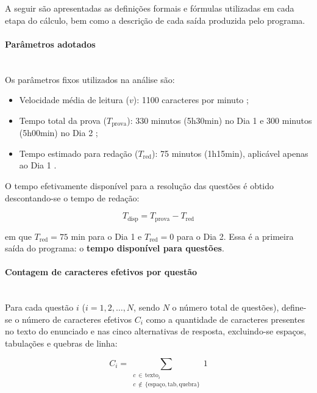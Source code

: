 \documentclass[a4paper,10pt, twocolumn]{article}
\begin{document}
A seguir são apresentadas as definições formais e fórmulas utilizadas em cada etapa do cálculo, bem como a descrição de cada saída produzida pelo programa.

\paragraph{Parâmetros adotados}
\mbox{}\\

Os parâmetros fixos utilizados na análise são:

\begin{itemize}
    \item Velocidade média de leitura ($v$): 1100 caracteres por minuto \cite{Messias2008};
    \item Tempo total da prova ($T_{\text{prova}}$): 330 minutos (5h30min) no Dia 1 e 300 minutos (5h00min) no Dia 2 \cite{inep_enem_servico};
    \item Tempo estimado para redação ($T_{\text{red}}$): 75 minutos (1h15min), aplicável apenas ao Dia 1 \cite{brasil_escola_redacao_enem}.
\end{itemize}

O tempo efetivamente disponível para a resolução das questões é obtido descontando-se o tempo de redação:

\begin{equation}
T_{\text{disp}} = T_{\text{prova}} - T_{\text{red}}
\label{eq:tempo_disponivel}
\end{equation}

em que $T_{\text{red}} = 75$ min para o Dia 1 e $T_{\text{red}} = 0$ para o Dia 2. Essa é a primeira saída do programa: o \textbf{tempo disponível para questões}.

\paragraph{Contagem de caracteres efetivos por questão}
\mbox{}\\

Para cada questão $i$ ($i = 1, 2, \ldots, N$, sendo $N$ o número total de questões), define-se o número de caracteres efetivos $C_i$ como a quantidade de caracteres presentes no texto do enunciado e nas cinco alternativas de resposta, excluindo-se espaços, tabulações e quebras de linha:

\begin{equation}
C_i = \sum_{\substack{c \,\in\, \text{texto}_i \\ c \,\notin\, \{\text{espaço}, \text{tab}, \text{quebra}\}}} 1
\label{eq:caracteres_questao}
\end{equation}
\end{document}

